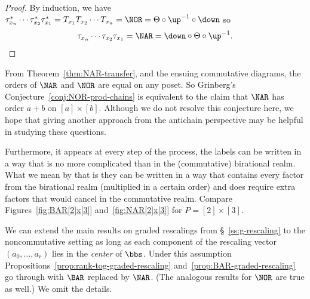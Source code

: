 \begin{proof}
By induction, we have $\tau_{x_n}^*\cdots \tau_{x_2}^* \tau_{x_1}^* = T_{x_1} T_{x_2} \cdots T_{x_n} = \NOR = \Theta\circ\up^{-1}\circ \down$ so
\[
\tau_{x_n}\cdots \tau_{x_2} \tau_{x_1} = \NAR
=\down\circ\Theta\circ\up^{-1}.\qedhere
\]
\end{proof}

From Theorem~\ref{thm:NAR-transfer}, and the ensuing commutative diagrams, the orders of $\NAR$ and $\NOR$ are equal on any poset. So Grinberg's Conjecture~\ref{conj:NOR-prod-chains}
is equivalent to the claim that $\NAR$ has order $a+b$ on
$[a]\times[b]$. Although we do not resolve this conjecture here, we hope that giving another approach from the antichain perspective may be helpful in studying these questions. 

Furthermore, it appears at every step of the process, the labels can be written in a way that is no more complicated than in the (commutative) birational realm. What we mean by that is they can be written in a way that contains every factor from the birational realm (multiplied in a certain order) and does  require extra factors that would cancel in the commutative realm.
Compare Figures~\ref{fig:BAR[2]x[3]} and~\ref{fig:NAR[2]x[3]} for $P=[2]\times[3]$.

We can extend the main results on graded rescalings from \S~\ref{ss:g-rescaling} to the
noncommutative setting as long as each component of the rescaling vector $(a_{0},\dots ,a_{r})$
lies in the \emph{center} of $\bbs$. Under this assumption
Propositions~\ref{prop:rank-tog-graded-rescaling} and~\ref{prop:BAR-graded-rescaling} go
through with $\BAR$ replaced by $\NAR$. (The analogous results for $\NOR$ are true as well.)
We omit the details. 
